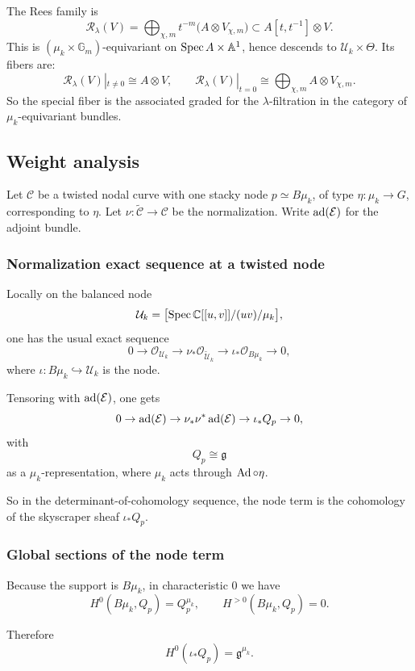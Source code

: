 \documentclass[12pt]{article}
\begin{document}
The Rees family is
\[
\mathcal{R}_{\lambda}(V)
=
\bigoplus_{\chi,m} t^{-m}\bigl(A\otimes V_{\chi,m}\bigr)
\subset
A[t,t^{-1}]\otimes V.
\]
This is \((\mu_k\times \mathbb{G}_m)\)-equivariant on \(\operatorname{Spec} A\times \mathbb{A}^1\), hence descends to \(\mathcal{U}_k\times \Theta\). Its fibers are:
\[
\mathcal{R}_{\lambda}(V)|_{t\neq 0}\cong A\otimes V,
\qquad
\mathcal{R}_{\lambda}(V)|_{t=0}
\cong
\bigoplus_{\chi,m} A\otimes V_{\chi,m}.
\]
So the special fiber is the associated graded for the \(\lambda\)-filtration in the category of \(\mu_k\)-equivariant bundles.

\subsection{Weight analysis}
Let \(\mathcal{C}\) be a twisted nodal curve with one stacky node
\(p \simeq B\mu_k\),
of type
\(\eta:\mu_k \to G\),
corresponding to \(\eta\). Let
\(\nu:\widetilde{\mathcal{C}}\to \mathcal{C}\)
be the normalization. Write $\operatorname{ad}(\mathcal{E})$
for the adjoint bundle.

\subsubsection{Normalization exact sequence at a twisted node}

Locally on the balanced node
\[
\mathcal{U}_k=\bigl[\operatorname{Spec} \mathbb{C}[[u,v]]/(uv) / \mu_k\bigr],
\]
one has the usual exact sequence
\[
0\to \mathcal{O}_{\mathcal{U}_k}\to \nu_*\mathcal{O}_{\widetilde{\mathcal{U}}_k}\to \iota_*\mathcal{O}_{B\mu_k}\to 0,
\]
where \(\iota:B\mu_k\hookrightarrow \mathcal{U}_k\) is the node.

Tensoring with \(\operatorname{ad}(\mathcal{E})\), one gets
\[
0\to \operatorname{ad}(\mathcal{E})\to \nu_*\nu^*\operatorname{ad}(\mathcal{E})\to \iota_*Q_p\to 0,
\]
with
\[
Q_p \cong \mathfrak{g}
\]
as a \(\mu_k\)-representation, where \(\mu_k\) acts through $\operatorname{Ad}\circ \eta$.

So in the determinant-of-cohomology sequence, the node term is the cohomology of the skyscraper sheaf \(\iota_*Q_p\).

\subsubsection{Global sections of the node term}

Because the support is \(B\mu_k\), in characteristic 0 we have
\[
H^0(B\mu_k,Q_p)=Q_p^{\mu_k}, \qquad H^{>0}(B\mu_k,Q_p)=0.
\]

Therefore
\[
H^0(\iota_*Q_p)=\mathfrak{g}^{\mu_k}.
\]
\end{document}
